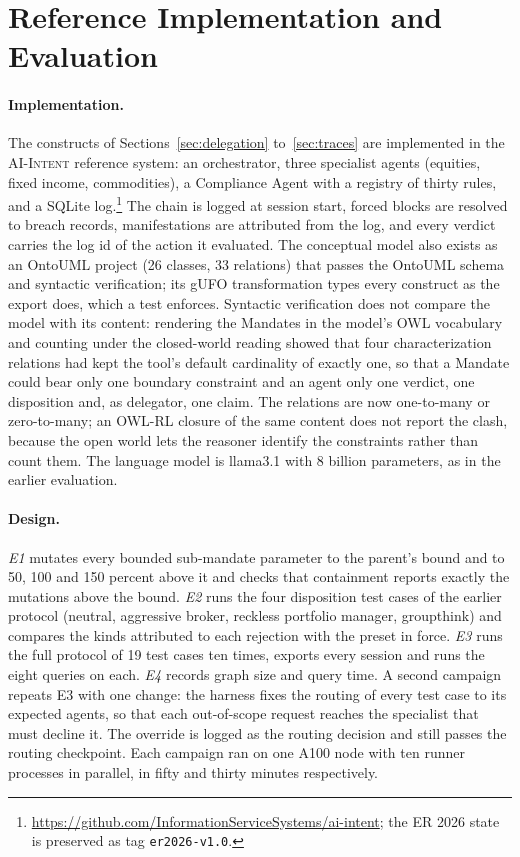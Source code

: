\documentclass[runningheads]{llncs}
\newcommand{\code}[1]{\texttt{#1}}
\begin{document}
\section{Reference Implementation and Evaluation}
\label{sec:evaluation}
\paragraph{Implementation.}
The constructs of Sections~\ref{sec:delegation} to~\ref{sec:traces} are implemented in the \textsc{AI-Intent} reference system: an orchestrator, three specialist agents (equities, fixed income, commodities), a Compliance Agent with a registry of thirty rules, and a SQLite log.\footnote{\url{https://github.com/InformationServiceSystems/ai-intent}; the ER 2026 state is preserved as tag \code{er2026-v1.0}.} The chain is logged at session start, forced blocks are resolved to breach records, manifestations are attributed from the log, and every verdict carries the log id of the action it evaluated. The conceptual model also exists as an OntoUML project (26 classes, 33 relations) that passes the OntoUML schema and syntactic verification; its gUFO transformation types every construct as the export does, which a test enforces. Syntactic verification does not compare the model with its content: rendering the Mandates in the model's OWL vocabulary and counting under the closed-world reading showed that four characterization relations had kept the tool's default cardinality of exactly one, so that a Mandate could bear only one boundary constraint and an agent only one verdict, one disposition and, as delegator, one claim. The relations are now one-to-many or zero-to-many; an OWL-RL closure of the same content does not report the clash, because the open world lets the reasoner identify the constraints rather than count them. The language model is llama3.1 with 8 billion parameters, as in the earlier evaluation.

\paragraph{Design.}
\emph{E1} mutates every bounded sub-mandate parameter to the parent's bound and to 50, 100 and 150 percent above it and checks that containment reports exactly the mutations above the bound. \emph{E2} runs the four disposition test cases of the earlier protocol (neutral, aggressive broker, reckless portfolio manager, groupthink) and compares the kinds attributed to each rejection with the preset in force. \emph{E3} runs the full protocol of 19 test cases ten times, exports every session and runs the eight queries on each. \emph{E4} records graph size and query time. A second campaign repeats E3 with one change: the harness fixes the routing of every test case to its expected agents, so that each out-of-scope request reaches the specialist that must decline it. The override is logged as the routing decision and still passes the routing checkpoint. Each campaign ran on one A100 node with ten runner processes in parallel, in fifty and thirty minutes respectively.
\end{document}
